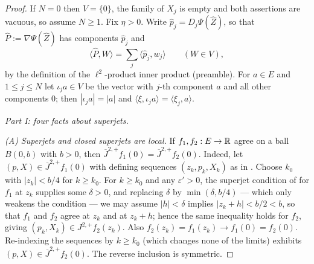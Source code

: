 \begin{proof}
If $N=0$ then $V=\{0\}$, the family of $X_j$ is empty and both assertions are
vacuous, so assume $N\ge1$. Fix $\eta>0$. Write $\widehat p_j=D_j\Psi(\widehat
Z)$, so that $\widehat P:=\nabla\Psi(\widehat Z)$ has components $\widehat p_j$
and
\begin{equation}\label{eq:srj-inner}
  \langle\widehat P,W\rangle=\sum_j\langle\widehat p_j,w_j\rangle\qquad(W\in V),
\end{equation}
by the definition of the $\ell^2$-product inner product (preamble). For
$a\in E$ and $1\le j\le N$ let $\iota_ja\in V$ be the vector with $j$-th
component $a$ and all other components $0$; then $|\iota_ja|=|a|$ and
$\langle\xi,\iota_ja\rangle=\langle\xi_j,a\rangle$.

\medskip\noindent\emph{Part I: four facts about superjets.}

\emph{(A) Superjets and closed superjets are local.}
If $f_1,f_2:E\to\mathbb{R}$ agree on a ball $B(0,b)$ with $b>0$, then
$\overline J^{2,+}f_1(0)=\overline J^{2,+}f_2(0)$. Indeed, let
$(p,X)\in\overline J^{2,+}f_1(0)$ with defining sequences $(z_k,p_k,X_k)$ as in
. Choose $k_0$ with $|z_k|<b/4$ for $k\ge k_0$. For
$k\ge k_0$ and any $\varepsilon'>0$, the superjet condition of
 for $f_1$ at $z_k$ supplies some $\delta>0$, and replacing
$\delta$ by $\min(\delta,b/4)$ --- which only weakens the condition --- we may
assume $|h|<\delta$ implies $|z_k+h|<b/2<b$, so that $f_1$ and $f_2$ agree at
$z_k$ and at $z_k+h$; hence the same inequality holds for $f_2$, giving
$(p_k,X_k)\in J^{2,+}f_2(z_k)$. Also $f_2(z_k)=f_1(z_k)\to f_1(0)=f_2(0)$.
Re-indexing the sequences by $k\ge k_0$ (which changes none of the limits)
exhibits $(p,X)\in\overline J^{2,+}f_2(0)$. The reverse inclusion is symmetric.


\end{proof}
